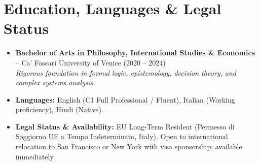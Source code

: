 \documentclass[a4paper,10pt]{article}
\begin{document}
\section{Education, Languages \& Legal Status}
\begin{itemize}
  \item \textbf{Bachelor of Arts in Philosophy, International Studies \& Economics} -- Ca' Foscari University of Venice (2020 -- 2024) \\
  \textit{Rigorous foundation in formal logic, epistemology, decision theory, and complex systems analysis.}
  \item \textbf{Languages:} English (C1 Full Professional / Fluent), Italian (Working proficiency), Hindi (Native).
  \item \textbf{Legal Status \& Availability:} EU Long-Term Resident (Permesso di Soggiorno UE a Tempo Indeterminato, Italy). Open to international relocation to San Francisco or New York with visa sponsorship; available immediately.
\end{itemize}
\end{document}
